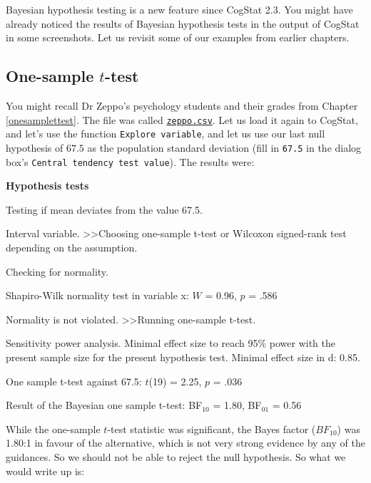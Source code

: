 \documentclass[
]{book}
\theoremstyle{definition}
\theoremstyle{definition}
\theoremstyle{definition}
\theoremstyle{definition}
\theoremstyle{remark}
\begin{document}
Bayesian hypothesis testing is a new feature since CogStat 2.3. You might have already noticed the results of Bayesian hypothesis tests in the output of CogStat in some screenshots. Let us revisit some of our examples from earlier chapters.

\hypertarget{one-sample-t-test}{%
\subsection{\texorpdfstring{One-sample \(t\)-test}{One-sample t-test}}\label{one-sample-t-test}}

You might recall Dr Zeppo's psychology students and their grades from Chapter \ref{onesamplettest}. The file was called \href{resources/data/zeppo.csv}{\texttt{zeppo.csv}}. Let us load it again to CogStat, and let's use the function \texttt{Explore\ variable}, and let us use our last null hypothesis of \(67.5\) as the population standard deviation (fill in \texttt{67.5} in the dialog box's \texttt{Central\ tendency\ test\ value}). The results were:

\begin{tcolorbox}[colback=white,
  colframe=lightgray,
  coltext=black,
  boxsep=4pt,
  boxrule=0.3pt,
  arc=0pt]
  {   \sffamily
      \color{CSblue}\textbf{Hypothesis tests}
      
      \color{CSgreen}Testing if mean deviates from the value 67.5.
      
      Interval variable. \textgreater\textgreater  Choosing one-sample t-test or Wilcoxon signed-rank test depending on the assumption.

      Checking for normality.

      \color{black}
      Shapiro-Wilk normality test in variable x: $W$ = 0.96, $p$ = .586

      \color{CSgreen}
      Normality is not violated. \textgreater\textgreater Running one-sample t-test.

      \color{black}
      Sensitivity power analysis. Minimal effect size to reach 95\% power with the present sample size for the present hypothesis test. Minimal effect size in d: 0.85.
      
      One sample t-test against 67.5: $t$(19) = 2.25, $p$ = .036

      Result of the Bayesian one sample t-test: BF$_{10}$ = 1.80, BF$_{01}$ = 0.56
      \normalfont
  }
\end{tcolorbox}

While the one-sample \(t\)-test statistic was significant, the Bayes factor (\(BF_10\)) was 1.80:1 in favour of the alternative, which is not very strong evidence by any of the guidances. So we should not be able to reject the null hypothesis. So what we would write up is:
\end{document}
